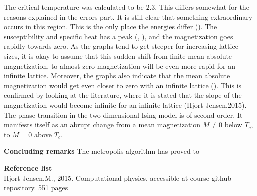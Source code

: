 \documentclass[10pt,a4paper]{article}
\begin{document}
\noindent The critical temperature was calculated to be $2.3$. This differs somewhat for the reasons explained in the errors part. It is still clear that something extraordinary occurs in this region. This is the only place the energies differ (). The susceptibility and specific heat has a peak (, ), and the magnetization goes rapidly towards zero. As the graphs tend to get steeper for increasing lattice sizes, it is okay to assume that this sudden shift from finite mean absolute magnetization, to almost zero magnetization will be even more rapid for an infinite lattice. Moreover, the graphs also indicate that the mean absolute magnetization would get even closer to zero with an infinite lattice (). This is confirmed by looking at the literature, where it is stated that the slope of the magnetization would become infinite for an infinite lattice (Hjort-Jensen,2015). The phase transition in the two dimensional Ising model is of second order. It manifests itself as an abrupt change from a mean magnetization $M \neq 0$ below $T_c$, to $M=0$ above $T_c$. 




  
\newpage
{\LARGE\bf
Concluding remarks
}
The metropolis algorithm has proved to 















\newpage
{\LARGE\bf
Reference list
}\\
Hjort-Jensen,M., 2015. Computational physics, accessible at course github repository. 551 pages
\end{document}
